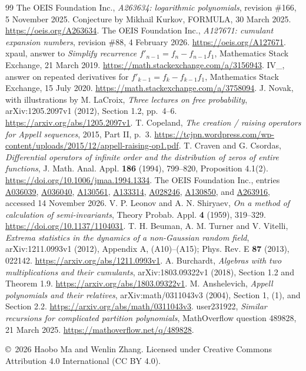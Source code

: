 \documentclass[11pt]{article}
\begin{document}
\begin{thebibliography}{99}
 The OEIS Foundation Inc., \emph{A263634: logarithmic
polynomials}, revision \#166, 5 November 2025. Conjecture by Mikhail
Kurkov, FORMULA, 30 March 2025.
\url{https://oeis.org/A263634}.
 The OEIS Foundation Inc., \emph{A127671:
cumulant expansion numbers}, revision \#88, 4 February 2026.
\url{https://oeis.org/A127671}.
 xpaul, answer to \emph{Simplify recurrence
$f'_{n-1}=f_n-f_{n-1}f_1$}, Mathematics Stack Exchange,
21 March 2019. \url{https://math.stackexchange.com/a/3156943}.
 IV\_, answer on repeated derivatives for
$f'_{k-1}=f_k-f_{k-1}f_1$, Mathematics Stack Exchange,
15 July 2020. \url{https://math.stackexchange.com/a/3758094}.
 J. Novak, with illustrations by M. LaCroix,
\emph{Three lectures on free probability}, arXiv:1205.2097v1 (2012),
Section 1.2, pp.~4--6. \url{https://arxiv.org/abs/1205.2097v1}.
 T. Copeland, \emph{The creation / raising
operators for Appell sequences}, 2015, Part II, p.~3.
\url{https://tcjpn.wordpress.com/wp-content/uploads/2015/12/appell-raising-op1.pdf}.
 T. Craven and G. Csordas, \emph{Differential
operators of infinite order and the distribution of zeros of entire
functions}, J. Math. Anal. Appl. \textbf{186} (1994), 799--820,
Proposition 4.1(2). \url{https://doi.org/10.1006/jmaa.1994.1334}.
 The OEIS Foundation Inc., entries
\href{https://oeis.org/A036039}{A036039},
\href{https://oeis.org/A036040}{A036040},
\href{https://oeis.org/A130561}{A130561},
\href{https://oeis.org/A133314}{A133314},
\href{https://oeis.org/A028246}{A028246},
\href{https://oeis.org/A130850}{A130850}, and
\href{https://oeis.org/A263916}{A263916}, accessed 14 November 2026.
 V. P. Leonov and A. N. Shiryaev, \emph{On a method
of calculation of semi-invariants}, Theory Probab. Appl. \textbf{4}
(1959), 319--329. \url{https://doi.org/10.1137/1104031}.
 T. H. Beuman, A. M. Turner and V. Vitelli,
\emph{Extrema statistics in the dynamics of a non-Gaussian random field},
arXiv:1211.0993v1 (2012), Appendix A, (A10)--(A15);
Phys. Rev. E \textbf{87} (2013), 022142.
\url{https://arxiv.org/abs/1211.0993v1}.
 A. Burchardt, \emph{Algebras with two
multiplications and their cumulants}, arXiv:1803.09322v1 (2018),
Section 1.2 and Theorem 1.9.
\url{https://arxiv.org/abs/1803.09322v1}.
 M. Anshelevich, \emph{Appell polynomials
and their relatives}, arXiv:math/0311043v3 (2004), Section 1, (1), and Section 2.2.
\url{https://arxiv.org/abs/math/0311043v3}.
 user231922, \emph{Similar recursions for complicated
partition polynomials}, MathOverflow question 489828,
21 March 2025. \url{https://mathoverflow.net/q/489828}.
\end{thebibliography}
\medskip\noindent\small
\copyright\ 2026 Haobo Ma and Wenlin Zhang.
Licensed under Creative Commons Attribution 4.0 International
(CC BY 4.0).
\end{document}
